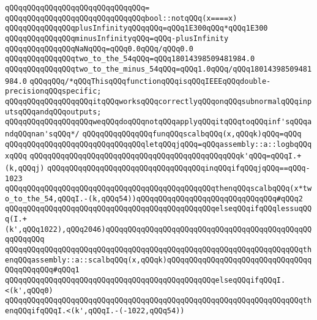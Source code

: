 \verb|qQQqqQQqqQQqqQQqqQQqqQQqqQQqqQQq=|\newline
\verb|qQQqqQQqqQQqqQQqqQQqqQQqqQQqqQQqbool::notqQQq(x====x)|\newline
\newline
\verb|qQQqqQQqqQQqqQQqplusInfinityqQQqqQQq=qQQq1E300qQQq*qQQq1E300|\newline
\verb|qQQqqQQqqQQqqQQqminusInfinityqQQq=qQQq-plusInfinity|\newline
\verb|qQQqqQQqqQQqqQQqNaNqQQq=qQQq0.0qQQq/qQQq0.0|\newline
\newline
\verb|qQQqqQQqqQQqqQQqtwo_to_the_54qQQq=qQQq18014398509481984.0|\newline
\verb|qQQqqQQqqQQqqQQqtwo_to_the_minus_54qQQq=qQQq1.0qQQq/qQQq18014398509481984.0|\newline
\newline
\verb|qQQqqQQq/*qQQqThisqQQqfunctionqQQqisqQQqIEEEqQQqdouble-precisionqQQqspecific;|\newline
\verb|qQQqqQQqqQQqqQQqqQQqitqQQqworksqQQqcorrectlyqQQqonqQQqsubnormalqQQqinputsqQQqandqQQqoutputs;|\newline
\verb|qQQqqQQqqQQqqQQqqQQqweqQQqdoqQQqnotqQQqapplyqQQqitqQQqtoqQQqinf'sqQQqandqQQqnan'sqQQq*/|\newline
\verb|qQQqqQQqqQQqqQQqfunqQQqscalbqQQq(x,qQQqk)qQQq=qQQq|\newline
\verb|qQQqqQQqqQQqqQQqqQQqqQQqqQQqqQQqletqQQqjqQQq=qQQqassembly::a::logbqQQqxqQQq|\newline
\verb|qQQqqQQqqQQqqQQqqQQqqQQqqQQqqQQqqQQqqQQqqQQqqQQqk'qQQq=qQQqI.+(k,qQQqj)|\newline
\verb|qQQqqQQqqQQqqQQqqQQqqQQqqQQqqQQqqQQqinqQQqifqQQqjqQQq==qQQq-1023|\newline
\verb|qQQqqQQqqQQqqQQqqQQqqQQqqQQqqQQqqQQqqQQqqQQqqQQqthenqQQqscalbqQQq(x*two_to_the_54,qQQqI.-(k,qQQq54))qQQqqQQqqQQqqQQqqQQqqQQqqQQqqQQq#qQQq2|\newline
\verb|qQQqqQQqqQQqqQQqqQQqqQQqqQQqqQQqqQQqqQQqqQQqqQQqelseqQQqifqQQqlessuqQQq(I.+(k',qQQq1022),qQQq2046)qQQqqQQqqQQqqQQqqQQqqQQqqQQqqQQqqQQqqQQqqQQqqQQqqQQqqQQq|\newline
\verb|qQQqqQQqqQQqqQQqqQQqqQQqqQQqqQQqqQQqqQQqqQQqqQQqqQQqqQQqqQQqqQQqqQQqthenqQQqassembly::a::scalbqQQq(x,qQQqk)qQQqqQQqqQQqqQQqqQQqqQQqqQQqqQQqqQQqqQQqqQQq#qQQq1|\newline
\verb|qQQqqQQqqQQqqQQqqQQqqQQqqQQqqQQqqQQqqQQqqQQqqQQqelseqQQqifqQQqI.<(k',qQQq0)|\newline
\verb|qQQqqQQqqQQqqQQqqQQqqQQqqQQqqQQqqQQqqQQqqQQqqQQqqQQqqQQqqQQqqQQqqQQqthenqQQqifqQQqI.<(k',qQQqI.-(-1022,qQQq54))|\newline
